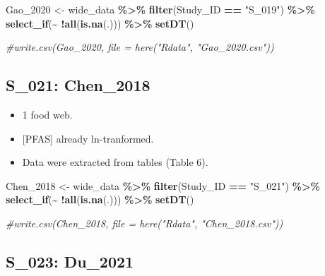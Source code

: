 \documentclass[
]{article}
\newenvironment{Shaded}{\begin{snugshade}}{\end{snugshade}}
\newcommand{\CommentTok}[1]{\textcolor[rgb]{0.56,0.35,0.01}{\textit{#1}}}
\newcommand{\FunctionTok}[1]{\textcolor[rgb]{0.13,0.29,0.53}{\textbf{#1}}}
\newcommand{\NormalTok}[1]{#1}
\newcommand{\OtherTok}[1]{\textcolor[rgb]{0.56,0.35,0.01}{#1}}
\newcommand{\SpecialCharTok}[1]{\textcolor[rgb]{0.81,0.36,0.00}{\textbf{#1}}}
\newcommand{\StringTok}[1]{\textcolor[rgb]{0.31,0.60,0.02}{#1}}
\providecommand{\tightlist}{%
  \setlength{\itemsep}{0pt}\setlength{\parskip}{0pt}}
\begin{document}
\begin{Shaded}
\begin{Highlighting}[]
\NormalTok{Gao\_2020 }\OtherTok{\textless{}{-}}\NormalTok{ wide\_data }\SpecialCharTok{\%\textgreater{}\%} 
  \FunctionTok{filter}\NormalTok{(Study\_ID }\SpecialCharTok{==} \StringTok{"S\_019"}\NormalTok{) }\SpecialCharTok{\%\textgreater{}\%}
  \FunctionTok{select\_if}\NormalTok{(}\SpecialCharTok{\textasciitilde{}} \SpecialCharTok{!}\FunctionTok{all}\NormalTok{(}\FunctionTok{is.na}\NormalTok{(.))) }\SpecialCharTok{\%\textgreater{}\%}
  \FunctionTok{setDT}\NormalTok{()}

\CommentTok{\#write.csv(Gao\_2020, file = here("Rdata", "Gao\_2020.csv"))}
\end{Highlighting}
\end{Shaded}

\subsection{S\_021: Chen\_2018}\label{s_021-chen_2018}

\begin{itemize}
\tightlist
\item
  1 food web.
\item
  {[}PFAS{]} already ln-tranformed.
\item
  Data were extracted from tables (Table 6).
\end{itemize}

\begin{Shaded}
\begin{Highlighting}[]
\NormalTok{Chen\_2018 }\OtherTok{\textless{}{-}}\NormalTok{ wide\_data }\SpecialCharTok{\%\textgreater{}\%} 
  \FunctionTok{filter}\NormalTok{(Study\_ID }\SpecialCharTok{==} \StringTok{"S\_021"}\NormalTok{) }\SpecialCharTok{\%\textgreater{}\%}
  \FunctionTok{select\_if}\NormalTok{(}\SpecialCharTok{\textasciitilde{}} \SpecialCharTok{!}\FunctionTok{all}\NormalTok{(}\FunctionTok{is.na}\NormalTok{(.))) }\SpecialCharTok{\%\textgreater{}\%}
  \FunctionTok{setDT}\NormalTok{()}

\CommentTok{\#write.csv(Chen\_2018, file = here("Rdata", "Chen\_2018.csv"))}
\end{Highlighting}
\end{Shaded}

\subsection{S\_023: Du\_2021}\label{s_023-du_2021}
\end{document}

